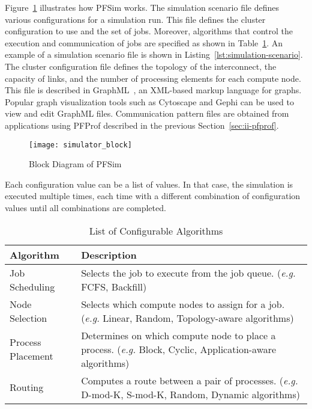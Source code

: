 Figure~\ref{fig:simulator-block} illustrates how PFSim works. The
simulation scenario file defines various configurations for a simulation
run. This file defines the cluster configuration to use and the set of
jobs. Moreover, algorithms that control the execution and communication
of jobs are specified as shown in Table~\ref{tbl:simulator-algorithm}.
An example of a simulation scenario file is shown in
Listing~\ref{lst:simulation-scenario}. The cluster configuration file
defines the topology of the interconnect, the capacity of links, and the
number of processing elements for each compute node. This file is
described in GraphML~\autocite{Brandes2013}, an XML-based markup
language for graphs. Popular graph visualization tools such as Cytoscape
and Gephi can be used to view and edit GraphML files. Communication
pattern files are obtained from applications using PFProf described in
the previous Section~\ref{sec:ii-pfprof}.

\begin{figure}
    \centering
    \texttt{[image: simulator\_block]}
    \caption{Block Diagram of PFSim}%
    \label{fig:simulator-block}
\end{figure}

Each configuration value can be a list of values. In that case, the
simulation is executed multiple times, each time with a different
combination of configuration values until all combinations are
completed.

\begin{table}
    \centering
    \normalsize
    \caption{List of Configurable Algorithms}%
    \label{tbl:simulator-algorithm}
    \begin{tabularx}{\linewidth}{lX}
        \toprule
        Algorithm         & Description                                                 \\
        \midrule
        Job Scheduling    & Selects the job to execute from the job queue.
                            (\emph{e.g.} FCFS, Backfill)                                \\
        Node Selection    & Selects which compute nodes to assign for a job.
                            (\emph{e.g.} Linear, Random, Topology-aware algorithms)     \\
        Process Placement & Determines on which compute node to place a process.
                            (\emph{e.g.} Block, Cyclic, Application-aware algorithms)   \\
        Routing           & Computes a route between a pair of processes.
                            (\emph{e.g.} D-mod-K, S-mod-K, Random, Dynamic algorithms)  \\
        \bottomrule
    \end{tabularx}
\end{table}

